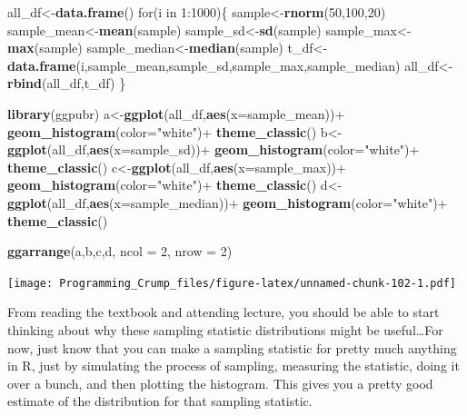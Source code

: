 \documentclass[]{book}
\newenvironment{Shaded}{\begin{snugshade}}{\end{snugshade}}
\newcommand{\KeywordTok}[1]{\textcolor[rgb]{0.13,0.29,0.53}{\textbf{{#1}}}}
\newcommand{\DataTypeTok}[1]{\textcolor[rgb]{0.13,0.29,0.53}{{#1}}}
\newcommand{\DecValTok}[1]{\textcolor[rgb]{0.00,0.00,0.81}{{#1}}}
\newcommand{\StringTok}[1]{\textcolor[rgb]{0.31,0.60,0.02}{{#1}}}
\newcommand{\NormalTok}[1]{{#1}}
\theoremstyle{definition}
\theoremstyle{definition}
\theoremstyle{definition}
\theoremstyle{remark}
\begin{document}
\begin{Shaded}
\begin{Highlighting}[]
\NormalTok{all_df<-}\KeywordTok{data.frame}\NormalTok{()}
\NormalTok{for(i in }\DecValTok{1}\NormalTok{:}\DecValTok{1000}\NormalTok{)\{}
  \NormalTok{sample<-}\KeywordTok{rnorm}\NormalTok{(}\DecValTok{50}\NormalTok{,}\DecValTok{100}\NormalTok{,}\DecValTok{20}\NormalTok{)}
  \NormalTok{sample_mean<-}\KeywordTok{mean}\NormalTok{(sample)}
  \NormalTok{sample_sd<-}\KeywordTok{sd}\NormalTok{(sample)}
  \NormalTok{sample_max<-}\KeywordTok{max}\NormalTok{(sample)}
  \NormalTok{sample_median<-}\KeywordTok{median}\NormalTok{(sample)}
  \NormalTok{t_df<-}\KeywordTok{data.frame}\NormalTok{(i,sample_mean,sample_sd,sample_max,sample_median)}
  \NormalTok{all_df<-}\KeywordTok{rbind}\NormalTok{(all_df,t_df)}
\NormalTok{\}}

\KeywordTok{library}\NormalTok{(ggpubr)}
\NormalTok{a<-}\KeywordTok{ggplot}\NormalTok{(all_df,}\KeywordTok{aes}\NormalTok{(}\DataTypeTok{x=}\NormalTok{sample_mean))+}
\StringTok{  }\KeywordTok{geom_histogram}\NormalTok{(}\DataTypeTok{color=}\StringTok{"white"}\NormalTok{)+}
\StringTok{  }\KeywordTok{theme_classic}\NormalTok{()}
\NormalTok{b<-}\KeywordTok{ggplot}\NormalTok{(all_df,}\KeywordTok{aes}\NormalTok{(}\DataTypeTok{x=}\NormalTok{sample_sd))+}
\StringTok{  }\KeywordTok{geom_histogram}\NormalTok{(}\DataTypeTok{color=}\StringTok{"white"}\NormalTok{)+}
\StringTok{  }\KeywordTok{theme_classic}\NormalTok{()}
\NormalTok{c<-}\KeywordTok{ggplot}\NormalTok{(all_df,}\KeywordTok{aes}\NormalTok{(}\DataTypeTok{x=}\NormalTok{sample_max))+}
\StringTok{  }\KeywordTok{geom_histogram}\NormalTok{(}\DataTypeTok{color=}\StringTok{"white"}\NormalTok{)+}
\StringTok{  }\KeywordTok{theme_classic}\NormalTok{()}
\NormalTok{d<-}\KeywordTok{ggplot}\NormalTok{(all_df,}\KeywordTok{aes}\NormalTok{(}\DataTypeTok{x=}\NormalTok{sample_median))+}
\StringTok{  }\KeywordTok{geom_histogram}\NormalTok{(}\DataTypeTok{color=}\StringTok{"white"}\NormalTok{)+}
\StringTok{  }\KeywordTok{theme_classic}\NormalTok{()}

\KeywordTok{ggarrange}\NormalTok{(a,b,c,d,}
          \DataTypeTok{ncol =} \DecValTok{2}\NormalTok{, }\DataTypeTok{nrow =} \DecValTok{2}\NormalTok{)}
\end{Highlighting}
\end{Shaded}

\texttt{[image: Programming\_Crump\_files/figure-latex/unnamed-chunk-102-1.pdf]}

From reading the textbook and attending lecture, you should be able to
start thinking about why these sampling statistic distributions might be
useful\ldots{}For now, just know that you can make a sampling statistic
for pretty much anything in R, just by simulating the process of
sampling, measuring the statistic, doing it over a bunch, and then
plotting the histogram. This gives you a pretty good estimate of the
distribution for that sampling statistic.
\end{document}
